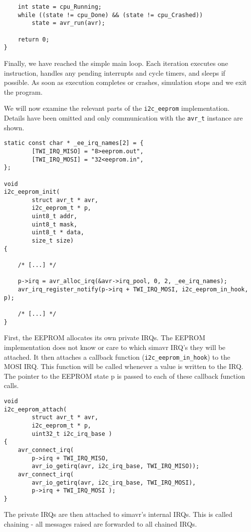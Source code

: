 \begin{lstlisting}
    int state = cpu_Running;
    while ((state != cpu_Done) && (state != cpu_Crashed))
        state = avr_run(avr);

    return 0;
}
\end{lstlisting}

Finally, we have reached the simple main loop. Each iteration executes one
instruction, handles any pending interrupts and cycle timers, and sleeps if
possible. As soon as execution completes or crashes, simulation stops and we
exit the program.

We will now examine the relevant parts of the \lstinline|i2c_eeprom| implementation.
Details have been omitted and only communication with the \lstinline|avr_t| instance are
shown.

\begin{lstlisting}
static const char * _ee_irq_names[2] = {
		[TWI_IRQ_MISO] = "8>eeprom.out",
		[TWI_IRQ_MOSI] = "32<eeprom.in",
};

void
i2c_eeprom_init(
		struct avr_t * avr,
		i2c_eeprom_t * p,
		uint8_t addr,
		uint8_t mask,
		uint8_t * data,
		size_t size)
{

    /* [...] */

	p->irq = avr_alloc_irq(&avr->irq_pool, 0, 2, _ee_irq_names);
	avr_irq_register_notify(p->irq + TWI_IRQ_MOSI, i2c_eeprom_in_hook, p);

    /* [...] */
}
\end{lstlisting}

First, the EEPROM allocates its own private IRQs. The EEPROM implementation
does not know or care to which simavr IRQ's they will be attached. It then
attaches a callback function (\lstinline|i2c_eeprom_in_hook|) to the MOSI IRQ. This
function will be called whenever a value is written to the IRQ. The pointer to
the EEPROM state p is passed to each of these callback function calls.

\begin{lstlisting}
void
i2c_eeprom_attach(
		struct avr_t * avr,
		i2c_eeprom_t * p,
		uint32_t i2c_irq_base )
{
	avr_connect_irq(
		p->irq + TWI_IRQ_MISO,
		avr_io_getirq(avr, i2c_irq_base, TWI_IRQ_MISO));
	avr_connect_irq(
		avr_io_getirq(avr, i2c_irq_base, TWI_IRQ_MOSI),
		p->irq + TWI_IRQ_MOSI );
}
\end{lstlisting}

The private IRQs are then attached to simavr's internal IRQs. This is called
chaining - all messages raised are forwarded to all chained IRQs.

